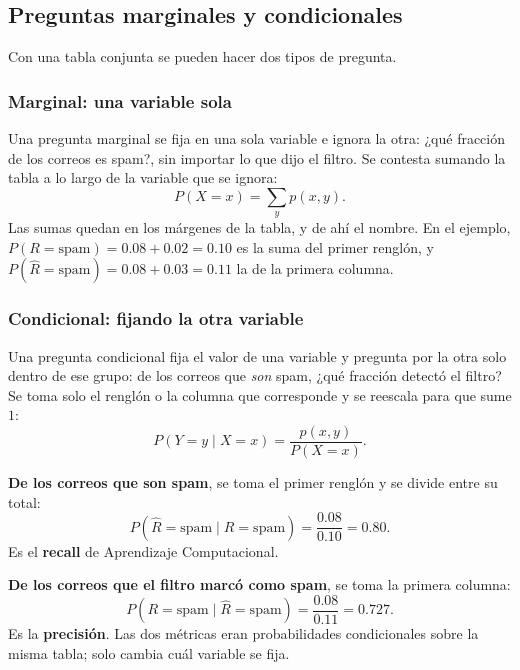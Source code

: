 \documentclass[11pt,letterpaper]{article}
\begin{document}

\subsection*{Preguntas marginales y condicionales}

Con una tabla conjunta se pueden hacer dos tipos de pregunta.

\subsubsection*{Marginal: una variable sola}

Una pregunta marginal se fija en una sola variable e ignora la otra:
¿qué fracción de los correos es spam?, sin importar lo que dijo el
filtro. Se contesta sumando la tabla a lo largo de la variable que se
ignora:
\[
    P(X = x) = \sum_{y} p(x, y) .
\]
Las sumas quedan en los márgenes de la tabla, y de ahí el nombre. En
el ejemplo, $P(R = \text{spam}) = 0.08 + 0.02 = 0.10$ es la suma del
primer renglón, y $P(\hat{R} = \text{spam}) = 0.08 + 0.03 = 0.11$ la
de la primera columna.

\subsubsection*{Condicional: fijando la otra variable}

Una pregunta condicional fija el valor de una variable y pregunta por
la otra solo dentro de ese grupo: de los correos que \emph{son} spam,
¿qué fracción detectó el filtro? Se toma solo el renglón o la columna
que corresponde y se reescala para que sume $1$:
\[
    P(Y = y \mid X = x) = \frac{p(x, y)}{P(X = x)} .
\]

\begin{ejemplo}
    \textbf{De los correos que son spam}, se toma el primer renglón y
    se divide entre su total:
    \[
        P(\hat{R} = \text{spam} \mid R = \text{spam})
        = \frac{0.08}{0.10} = 0.80 .
    \]
    Es el \textbf{recall} de Aprendizaje Computacional.

    \textbf{De los correos que el filtro marcó como spam}, se toma la
    primera columna:
    \[
        P(R = \text{spam} \mid \hat{R} = \text{spam})
        = \frac{0.08}{0.11} = 0.727 .
    \]
    Es la \textbf{precisión}. Las dos métricas eran probabilidades
    condicionales sobre la misma tabla; solo cambia cuál variable se
    fija.
\end{ejemplo}
\end{document}
